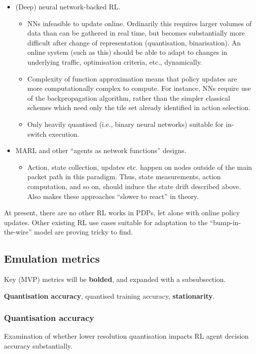\documentclass[sigconf,natbib=false]{acmart}
\begin{document}
\begin{appendices}
	\begin{itemize}
		\item (Deep) neural network-backed RL.
		\begin{itemize}
			\item NNs infeasible to update online. Ordinarily this requires larger volumes of data than can be gathered in real time, but becomes substantially more difficult after change of representation (quantisation, binarisation). An online system (such as this) should be able to adapt to changes in underlying traffic, optimisation criteria, etc., dynamically.
			\item Complexity of function approximation means that policy updates are more computationally complex to compute. For instance, NNs require use of the backpropagation algorithm, rather than the simpler classical schemes which need only the tile set already identified in action selection.
			\item Only heavily quantised (i.e., binary neural networks) suitable for in-switch execution.
		\end{itemize}
		
		\item MARL and other ``agents as network functions'' designs.
		\begin{itemize}
			\item Action, state collection, updates etc. happen on nodes outside of the main packet path in this paradigm. Thus, state measurements, action computation, and so on, should induce the state drift described above. Also makes these approaches ``slower to react'' in theory.
		\end{itemize}
	\end{itemize}
	
	At present, there are no other RL works in PDPs, let alone with online policy updates.
	Other existing RL use cases suitable for adaptation to the ``bump-in-the-wire'' model are proving tricky to find.
	
	\subsection{Emulation metrics}
	Key (MVP) metrics will be \textbf{bolded}, and expanded with a subsubsection.
	
	\textbf{Quantisation accuracy}, quantised training accuracy, \textbf{stationarity}.
	
	\subsubsection{Quantisation accuracy}
	Examination of whether lower resolution quantisation impacts RL agent decision accuracy substantially.
	

\end{appendices}
\end{document}
